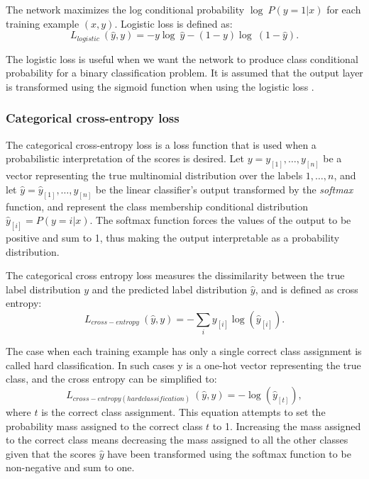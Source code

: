 The network maximizes the log conditional probability $\log\ P(y = 1|x)$ for each training example $(x,y)$.
Logistic loss is defined as:
\begin{equation}
  L_{logistic}\ (\hat{y},y)=-y\log\ \hat{y}-(1-y)\log\ (1-\hat{y}).
\end{equation}

The logistic loss is useful when we want the network to produce class conditional probability for a binary classification problem.
It is assumed that the output layer is transformed using the sigmoid function when using the logistic loss \cite{goldberg2017}.

\subsubsection{Categorical cross-entropy loss}\label{Categorical cross-entropy loss}
The categorical cross-entropy loss is a loss function that is used when a probabilistic interpretation of the scores is desired.
Let $y=y_{[1]},\ldots{},y_{[n]}$ be a vector representing the true multinomial distribution over the labels $1,\ldots{},n$, and let  $\hat{y}=\hat{y}_{[1]},\ldots{},\hat{y}_{[n]}$ be the linear classifier’s output transformed by the \textit{softmax} function, and represent the class membership conditional distribution $\hat{y}_{[i]} = P(y=i|x)$.
The softmax function forces the values of the output to be positive and sum to 1, thus making the output interpretable as a probability distribution.

The categorical cross entropy loss measures the dissimilarity between the true label distribution $y$ and the predicted label distribution $\hat{y}$, and is defined as cross entropy:
\begin{equation}
  L_{cross-entropy}\ (\hat{y},y)=-\sum_{i}y_{[i]}\log (\hat{y}_{[i]}).
\end{equation}

The case when each training example has only a single correct class assignment is called hard classification.
In such cases y is a one-hot vector representing the true class, and the cross entropy can be simplified to:
\begin{equation}
  L_{cross-entropy(hard classification)}\ (\hat{y},y)=-\log(\hat{y}_{[t]}),
\end{equation}
where $t$ is the correct class assignment.
This equation attempts to set the probability mass assigned to the correct class $t$ to 1.
Increasing the mass assigned to the correct class means decreasing the mass assigned to all the other classes given that the scores $\hat{y}$ have been transformed using the softmax function to be non-negative and sum to one.

